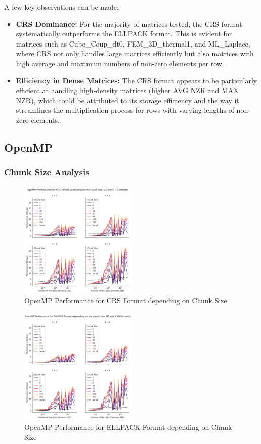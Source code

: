 \documentclass[12pt,oneside]{book} %
\begin{document}
A few key observations can be made:
\begin{itemize}
    \item \textbf{CRS Dominance:} For the majority of matrices tested, the CRS format systematically outperforms the ELLPACK format. This is evident for matrices such as Cube\_Coup\_dt0, FEM\_3D\_thermal1, and ML\_Laplace, where CRS not only handles large matrices efficiently but also matrices with high average and maximum numbers of non-zero elements per row.
    \item \textbf{Efficiency in Dense Matrices:} The CRS format appears to be particularly efficient at handling high-density matrices (higher AVG NZR and MAX NZR), which could be attributed to its storage efficiency and the way it streamlines the multiplication process for rows with varying lengths of non-zero elements.
\end{itemize}

\newpage
\subsection{OpenMP}
\subsubsection{Chunk Size Analysis}
\begin{figure}[H]
    \centering
    \includegraphics[width=0.5\textwidth]{../results/images/openMP_ChunkSize_CRS.png}
    \caption{OpenMP Performance for CRS Format depending on Chunk Size}
    \label{fig:openmpchunksizecrs}
\end{figure}

\begin{figure}[H]
    \centering
    \includegraphics[width=0.5\textwidth]{../results/images/openMP_ChunkSize_ELLPACK.png}
    \caption{OpenMP Performance for ELLPACK Format depending on Chunk Size}
    \label{fig:openmpchunksizellpack}
\end{figure}
\end{document}
